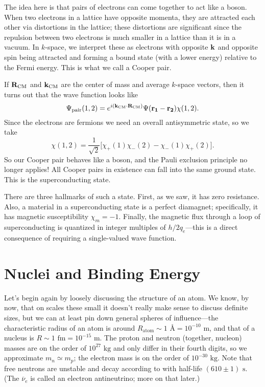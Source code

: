 \documentclass[../p052main.tex]{subfiles}
\begin{document}
The idea here is that pairs of electrons can come together to act like a boson.
When two electrons in a lattice have opposite momenta, they are attracted each other via distortions in the lattice; these distortions are significant since the repulsion between two electrons is much smaller in a lattice than it is in a vacuum.
In $k$-space, we interpret these as electrons with opposite $\mathbf{k}$ and opposite spin being attracted and forming a bound state (with a lower energy) relative to the Fermi energy.
This is what we call a Cooper pair.

If $\mathbf{R}_\textrm{CM}$ and $\mathbf{k}_\textrm{CM}$ are the center of mass and average $k$-space vectors, then it turns out that the wave function looks like
\[ \Psi_\textrm{pair}(1,2) = e^{i (\mathbf{k}_\textrm{CM} \cdot \mathbf{R}_\textrm{CM})} \Psi(\mathbf{\mathbf{r}_1 - \mathbf{r}_2}) \chi(1,2). \]
Since the electrons are fermions we need an overall antisymmetric state, so we take
\[ \chi(1,2) = \frac{1}{\sqrt{2}} \big[ \chi_+(1)\chi_-(2) - \chi_-(1) \chi_+(2) \big]. \]
So our Cooper pair behaves like a boson, and the Pauli exclusion principle no longer applies!
All Cooper pairs in existence can fall into the same ground state.
This is the superconducting state.

There are three hallmarks of such a state.
First, as we saw, it has zero resistance.
Also, a material in a superconducting state is a perfect diamagnet; specifically, it has magnetic susceptibility $\chi_m = -1$.
Finally, the magnetic flux through a loop of superconducting is quantized in integer multiples of $h / 2q_e$---this is a direct consequence of requiring a single-valued wave function.

\section{Nuclei and Binding Energy}
Let's begin again by loosely discussing the structure of an atom.
We know, by now, that on scales these small it doesn't really make sense to discuss definite sizes, but we can at least pin down general spheres of influence---the characteristic radius of an atom is around $R_\textrm{atom} \sim 1 \textrm{ \AA} = 10^{-10} \textrm{ m}$, and that of a nucleus is $R \sim 1 \textrm{ fm} = 10^{-15} \textrm{ m}$.
The proton and neutron (together, nucleon) masses are on the order of $10^{27} \textrm{ kg}$ and only differ in their fourth digits, so we approximate $m_n \simeq m_p$; the electron mass is on the order of $10^{-30} \textrm{ kg}$.
Note that free neutrons are unstable and decay according to  with half-life $(610 \pm 1) \text{ s}$.
(The $\overline{\nu}_e$ is called an electron antineutrino; more on that later.)
\end{document}
